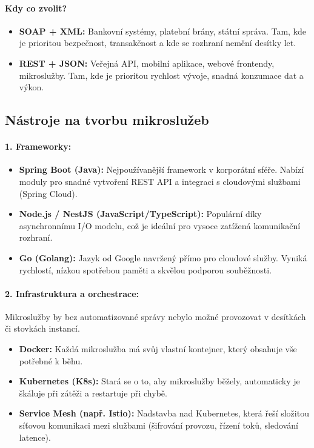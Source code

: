 \paragraph*{Kdy co zvolit?}
\begin{itemize}
    \item \textbf{SOAP + XML:} Bankovní systémy, platební brány, státní správa. Tam, kde je prioritou bezpečnost, transakčnost a kde se rozhraní nemění desítky let.
    \item \textbf{REST + JSON:} Veřejná API, mobilní aplikace, webové frontendy, mikroslužby. Tam, kde je prioritou rychlost vývoje, snadná konzumace dat a výkon.
\end{itemize}

\subsection{Nástroje na tvorbu mikroslužeb}

\paragraph*{1. Frameworky:}
\begin{itemize}
    \item \textbf{Spring Boot (Java):} Nejpoužívanější framework v korporátní sféře. Nabízí moduly pro snadné vytvoření REST API a integraci s cloudovými službami (Spring Cloud).
    \item \textbf{Node.js / NestJS (JavaScript/TypeScript):} Populární díky asynchronnímu I/O modelu, což je ideální pro vysoce zatížená komunikační rozhraní.
    \item \textbf{Go (Golang):} Jazyk od Google navržený přímo pro cloudové služby. Vyniká rychlostí, nízkou spotřebou paměti a skvělou podporou souběžnosti.
\end{itemize}

\paragraph*{2. Infrastruktura a orchestrace:}
Mikroslužby by bez automatizované správy nebylo možné provozovat v desítkách či stovkách instancí.
\begin{itemize}
    \item \textbf{Docker:} Každá mikroslužba má svůj vlastní kontejner, který obsahuje vše potřebné k běhu.
    \item \textbf{Kubernetes (K8s):} Stará se o to, aby mikroslužby běžely, automaticky je škáluje při zátěži a restartuje při chybě.
    \item \textbf{Service Mesh (např. Istio):} Nadstavba nad Kubernetes, která řeší složitou síťovou komunikaci mezi službami (šifrování provozu, řízení toků, sledování latence).
\end{itemize}

